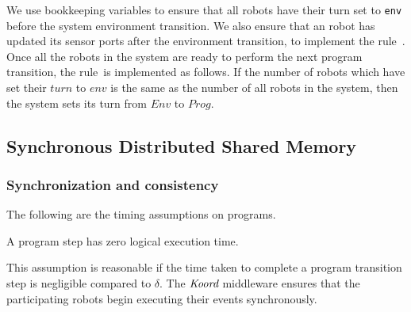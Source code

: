 %
%

We use bookkeeping variables to ensure that all robots have their turn set to \texttt{env} before the system environment transition.
We also ensure that an robot has updated its sensor ports after the environment transition,
to implement the rule~\RobotEnvToProgRule.
Once all the robots in the system are ready to perform the next program transition,
the rule~\EnvToProgRule is implemented as follows.
If the number of robots which have set their $\mathit{turn}$ to $\mathit{env}$ is the same as the number of all robots in the system,
then the system sets its turn from $\mathit{Env}$ to $\mathit{Prog}$.


\subsection{Synchronous Distributed Shared Memory}
\label{sec:memory}


%

\subsubsection{Synchronization and consistency}
The following are the timing assumptions on \lgname programs.
\begin{assumption} A program step has zero logical execution time.
\end{assumption}
This assumption is reasonable if the time taken to complete a program transition step is negligible compared to $\delta$.  The $\emph{Koord}$ middleware ensures that the participating robots begin executing their events synchronously.

